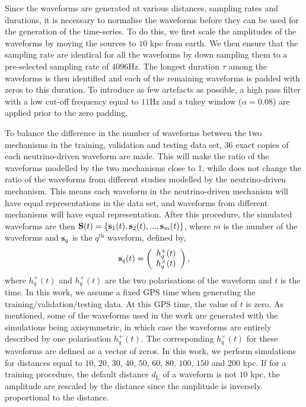 \documentclass[aps,twocolumn,showpacs,groupedaddress, nofootinbib]{revtex4}  %
\begin{document}
%
%
Since the waveforms are generated at various distances, sampling rates and
durations, it is necessary to normalise the waveforms before they can be used
for the generation of the time-series. To do this, we first scale the
amplitudes of the waveforms by moving the sources to $10$ kpc from earth. We
then ensure that the sampling rate are identical for all the waveforms by down
sampling them to a pre-selected sampling rate of $4096$Hz. The longest duration
$\tau$ among the waveforms is then identified and each of the remaining
waveforms is padded with zeros to this duration. To introduce as few artefacts
as possible, a high pass filter with a low cut-off frequency equal to $11$Hz
and a tukey window ($\alpha = 0.08$) are applied prior to the zero padding. 

%
%
To balance the difference in the number of waveforms between the two mechanisms
in the training, validation and testing data set, $36$ exact copies of each neutrino-driven waveform are
made. This will make the ratio of the waveforms modelled by the two mechanisms close to 1, 
while does not change the ratio of the waveforms from different studies modelled by the neutrino-driven mechanism. 
This means each waveform in the neutrino-driven mechanism will have equal representations in the data set,
and waveforms from different mechanisms will have equal representation.
After this procedure, the simulated waveforms are then $\bold{S}(t) = \{\bold{s}_{1}(t), \bold{s}_{2}(t),
..., \bold{s}_{m}(t)\}$, where $m$ is the number of the waveforms and
$\bold{s}_{q}$ is the $q^{\text{th}}$ waveform, defined by, 
%
\begin{equation}\label{eq:ht}
\bold{s}_q(t) = \left(\begin{array}{c} h_q^+(t) \\ h_q^\times(t)
\end{array}\right), 
\end{equation} 
%
where $h_q^+(t)$ and $h_q^\times(t)$ are the two polarisations of the waveform
and $t$ is the time. In this work, we assume a 
fixed GPS time when generating the training/validation/testing data. 
At this GPS time, the value of $t$ is zero.
As mentioned, some of the waveforms used in the work are
generated with the simulations being axisymmetric, in which case the waveforms
are entirely described by one polarisation $h_q^+(t)$. The corresponding
$h_q^\times(t)$ for these waveforms are defined as a vector of zeros. 
%
%
In this work, we perform simulations for distances equal to $10$, $20$, $30$,
$40$, $50$, $60$, $80$, $100$, $150$ and $200$ kpc. If for a training
procedure, the default distance $d_\text{L}$ of a waveform is not $10$ kpc, the amplitude are rescaled 
by the distance since the amplitude is inversely proportional to the distance.
\end{document}
